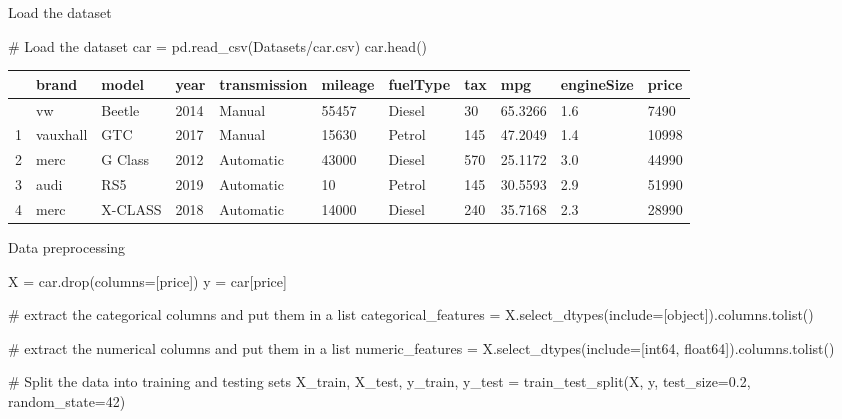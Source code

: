 \documentclass[
  letterpaper,
  DIV=11,
  numbers=noendperiod]{scrreprt}
\newenvironment{Shaded}{\begin{snugshade}}{\end{snugshade}}
\newcommand{\CommentTok}[1]{\textcolor[rgb]{0.37,0.37,0.37}{#1}}
\newcommand{\DecValTok}[1]{\textcolor[rgb]{0.68,0.00,0.00}{#1}}
\newcommand{\FloatTok}[1]{\textcolor[rgb]{0.68,0.00,0.00}{#1}}
\newcommand{\NormalTok}[1]{\textcolor[rgb]{0.00,0.23,0.31}{#1}}
\newcommand{\OperatorTok}[1]{\textcolor[rgb]{0.37,0.37,0.37}{#1}}
\newcommand{\StringTok}[1]{\textcolor[rgb]{0.13,0.47,0.30}{#1}}
\begin{document}
Load the dataset

\begin{Shaded}
\begin{Highlighting}[]
\CommentTok{\# Load the dataset}
\NormalTok{car }\OperatorTok{=}\NormalTok{ pd.read\_csv(}\StringTok{\textquotesingle{}Datasets/car.csv\textquotesingle{}}\NormalTok{)}
\NormalTok{car.head()}
\end{Highlighting}
\end{Shaded}

\begin{longtable}[]{@{}lllllllllll@{}}
\toprule\noalign{}
& brand & model & year & transmission & mileage & fuelType & tax & mpg &
engineSize & price \\
\midrule\noalign{}
\endhead
\bottomrule\noalign{}
\endlastfoot
0 & vw & Beetle & 2014 & Manual & 55457 & Diesel & 30 & 65.3266 & 1.6 &
7490 \\
1 & vauxhall & GTC & 2017 & Manual & 15630 & Petrol & 145 & 47.2049 &
1.4 & 10998 \\
2 & merc & G Class & 2012 & Automatic & 43000 & Diesel & 570 & 25.1172 &
3.0 & 44990 \\
3 & audi & RS5 & 2019 & Automatic & 10 & Petrol & 145 & 30.5593 & 2.9 &
51990 \\
4 & merc & X-CLASS & 2018 & Automatic & 14000 & Diesel & 240 & 35.7168 &
2.3 & 28990 \\
\end{longtable}

Data preprocessing

\begin{Shaded}
\begin{Highlighting}[]
\NormalTok{X }\OperatorTok{=}\NormalTok{ car.drop(columns}\OperatorTok{=}\NormalTok{[}\StringTok{\textquotesingle{}price\textquotesingle{}}\NormalTok{])}
\NormalTok{y }\OperatorTok{=}\NormalTok{ car[}\StringTok{\textquotesingle{}price\textquotesingle{}}\NormalTok{]}

\CommentTok{\# extract the categorical columns and put them in a list}
\NormalTok{categorical\_features }\OperatorTok{=}\NormalTok{ X.select\_dtypes(include}\OperatorTok{=}\NormalTok{[}\StringTok{\textquotesingle{}object\textquotesingle{}}\NormalTok{]).columns.tolist()}

\CommentTok{\# extract the numerical columns and put them in a list}
\NormalTok{numeric\_features }\OperatorTok{=}\NormalTok{ X.select\_dtypes(include}\OperatorTok{=}\NormalTok{[}\StringTok{\textquotesingle{}int64\textquotesingle{}}\NormalTok{, }\StringTok{\textquotesingle{}float64\textquotesingle{}}\NormalTok{]).columns.tolist()}

\CommentTok{\# Split the data into training and testing sets}
\NormalTok{X\_train, X\_test, y\_train, y\_test }\OperatorTok{=}\NormalTok{ train\_test\_split(X, y, test\_size}\OperatorTok{=}\FloatTok{0.2}\NormalTok{, random\_state}\OperatorTok{=}\DecValTok{42}\NormalTok{)}
\end{Highlighting}
\end{Shaded}
\end{document}
